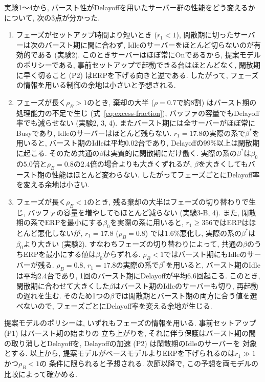 \documentclass[a4paper, 11pt, dvipdfmx]{jsreport}
\begin{document}
実験1〜4から, バースト性がDelayoffを用いたサーバー群の性能をどう変えるかについて,
次の3点が分かった.
\begin{enumerate}
    \item[(a)] フェーズがセットアップ時間より短いとき ($r_1 < 1$), 閑散期に切ったサーバーは次のバースト期に間に合わず,
        Idleのサーバーをほとんど切らないのが有効的である (実験2). このときサーバーはほぼ常にOnであるから,
        提案モデルのポリシーである, 事前セットアップで起動できる台はほとんどなく, 閑散期に早く切ること (P2) はERPを下げる向きと逆である.
        したがって, フェーズの情報を用いる制御の余地は小さいと予想される.
    \item[(b)] フェーズが長く$\rho_B > 1$のとき, 棄却の大半 ($\rho = 0.7$で約8割) はバースト期の処理能力の不足で生じ
        (式~\eqref{eq:excess-fraction}), バッファの容量でもDelayoff率でも減らせない (実験2, 3, 4). またバースト期には全サーバーがほぼ常にBusyであり, Idleのサーバーはほとんど残らない.
        $r_1 = 17.8$の実際の系で$\beta^*$を用いると, バースト期のIdleは平均$0.02$台であり, Delayoffの$99\%$以上は閑散期に起こる.
        そのため共通の$\beta$は実質的に閑散期にだけ働く. 実際の系の$\beta^*$は$\beta_0$の$5.0$倍と$\rho_B = 0.8$の$2.4$倍の場合よりも大きくずれるが, $\beta$を大きくしてもバースト期の性能はほとんど変わらない.
        したがってフェーズごとにDelayoff率を変える余地は小さい.
    \item[(c)] フェーズが長く$\rho_B < 1$のとき, 残る棄却の大半はフェーズの切り替わりで生じ,
        バッファの容量を増やしてもほとんど減らない (実験3-B, 4). また, 閑散期の系でERPを最小にする$\beta_0$を実際の系に用いると, $r_1 \ge 356$ではERPはほとんど悪化しないが,
        $r_1 = 17.8$ ($\rho_B = 0.8$) では$1.6\%$悪化し, 実際の系の$\beta^*$は$\beta_0$より大きい (実験2).
        すなわちフェーズの切り替わりによって, 共通の$\beta$のうちERPを最小にする値は$\beta_0$からずれる.
        $\rho_B < 1$ではバースト期にもIdleのサーバーが残る. $\rho_B = 0.8$, $r_1 = 17.8$の実際の系で$\beta^*$を用いると,
        バースト期のIdleは平均$2.4$台であり, 1回のバースト期にDelayoffが平均$6.6$回起こる.
        このとき, 閑散期に合わせて大きくした$\beta$はバースト期のIdleのサーバーも切り, 再起動の遅れを生む.
        そのため1つの$\beta$では閑散期とバースト期の両方に合う値を選べないので,
        フェーズごとにDelayoff率を変える余地が生じる.
\end{enumerate}
提案モデルのポリシーは, いずれもフェーズの情報を用いる. 事前セットアップ (P1) はバースト期の始まりの
立ち上がりを, それに伴う保護はバースト期の間の取り消しとDelayoffを, Delayoffの加速 (P2) は閑散期のIdleのサーバーを
対象とする. 以上から, 提案モデルがベースモデルよりERPを下げられるのは$r_1 \gg 1$かつ$\rho_B < 1$の
条件に限られると予想される. 次節以降で, この予想を両モデルの比較によって確かめる.
\end{document}
